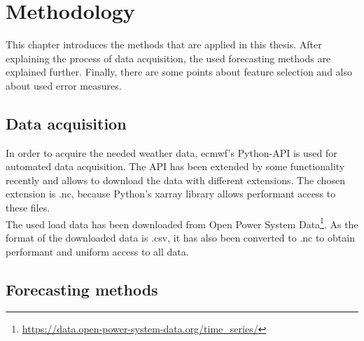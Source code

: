 \chapter{Methodology}
\label{ch:methods}

This chapter introduces the methods that are applied in this thesis. After explaining the process of data acquisition, the used forecasting methods are explained further. Finally, there are some points about feature selection and also about used error measures.


\section{Data acquisition}
\label{sec:dataq}

In order to acquire the needed weather data, \gls{ecmwf}'s Python-API is used for automated data acquisition. The API has been extended by some functionality recently and allows to download the data with different extensions. The chosen extension is .nc, because Python's xarray library allows performant access to these files.\\

The used load data has been downloaded from Open Power System Data\footnote{\url{https://data.open-power-system-data.org/time_series/}}. As the format of the downloaded data is .csv, it has also been converted to .nc to obtain performant and uniform access to all data.\\

\section{Forecasting methods}
\label{sec:forecastmet}

